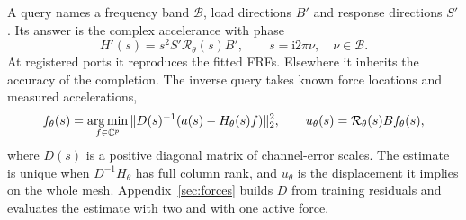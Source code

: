 A query names a frequency band $\mathcal B$, load directions $B'$ and response
directions $S'$. Its answer is the complex accelerance with phase
\begin{equation}
 H'(s)=s^2S'\mathcal R_\theta(s)B',\qquad s=\mathrm i2\pi\nu,\quad\nu\in\mathcal B.
 \label{eq:query}
\end{equation}
At registered ports it reproduces the fitted FRFs. Elsewhere it inherits
the accuracy of the completion. The inverse query takes known force locations
and measured accelerations,
\begin{equation}
 f_\theta(s)=\operatorname*{arg\,min}_{f\in\mathbb C^p}
 \|D(s)^{-1}(a(s)-H_\theta(s)f)\|_2^2,\qquad
 u_\theta(s)=\mathcal R_\theta(s)Bf_\theta(s),
 \label{eq:force-query}
\end{equation}
where $D(s)$ is a positive diagonal matrix of channel-error scales. The
estimate is unique when $D^{-1}H_\theta$ has full column rank, and
$u_\theta$ is the displacement it implies on the whole mesh.
Appendix~\ref{sec:forces} builds $D$ from training residuals and evaluates
the estimate with two and with one active force.
